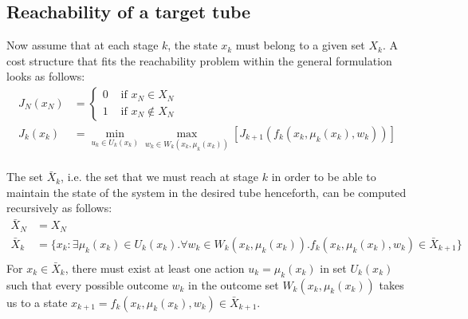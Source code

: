 \documentclass[11pt, oneside]{article}   	%
\begin{document}
\subsection{Reachability of a target tube}
Now assume that at each stage $k$, the state $x_k$ must belong to a given set $X_k$. A cost structure that fits the reachability problem within the general formulation looks as follows:
\begin{align*}
J_{N}(x_{N}) &= 
\begin{cases}
0 & \text{ if } x_N \in X_N\\
1 & \text{ if } x_N \not\in X_N
\end{cases}\\
J_{k}(x_{k}) &= \min_{u_k \in U_k(x_k)} \max_{w_k \in W_k(x_k,\mu_k(x_k))} \left[ J_{k+1}(f_k(x_k,\mu_k(x_k),w_k))\right]\\
\end{align*}

The set $\bar{X}_k$, i.e. the set that we must reach at stage $k$ in order to be able to maintain the state of the system in the desired tube henceforth, can be computed recursively as follows:
\begin{align*}
\bar{X}_N &= X_N\\
\bar{X}_k &= \{x_k: \exists \mu_k(x_k) \in U_k(x_k).\forall w_k\in W_k(x_k,\mu_k(x_k)).f_k(x_k,\mu_k(x_k),w_k) \in \bar{X}_{k+1}\}\\
\end{align*}
For $x_k \in \bar{X}_k$, there must exist at least one action $u_k=\mu_k(x_k)$ in set $U_k(x_k)$ such that every possible outcome $w_k$ in the outcome set $W_k(x_k,\mu_k(x_k))$ takes us to a state $x_{k+1} = f_k(x_k,\mu_k(x_k),w_k) \in \bar{X}_{k+1}$.
\end{document}
